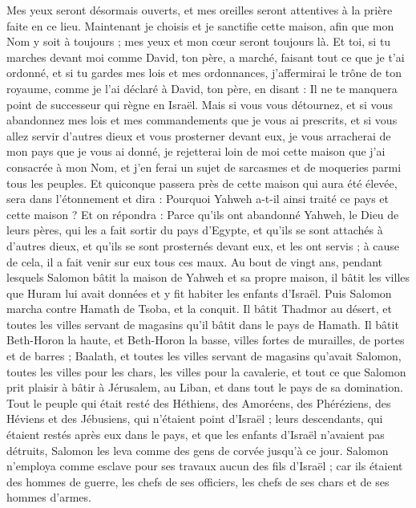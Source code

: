 \begin{multicols}{2}
Mes yeux seront désormais ouverts, et mes oreilles seront attentives à la prière faite en ce lieu.
Maintenant je choisis et je sanctifie cette maison, afin que mon Nom y soit à toujours ; mes yeux et mon cœur seront toujours là.
Et toi, si tu marches devant moi comme David, ton père, a marché, faisant tout ce que je t'ai ordonné, et si tu gardes mes lois et mes ordonnances,
j'affermirai le trône de ton royaume, comme je l'ai déclaré à David, ton père, en disant : Il ne te manquera point de successeur qui règne en Israël.
Mais si vous vous détournez, et si vous abandonnez mes lois et mes commandements que je vous ai prescrits, et si vous allez servir d'autres dieux et vous prosterner devant eux,
je vous arracherai de mon pays que je vous ai donné, je rejetterai loin de moi cette maison que j'ai consacrée à mon Nom, et j'en ferai un sujet de sarcasmes et de moqueries parmi tous les peuples.
Et quiconque passera près de cette maison qui aura été élevée, sera dans l'étonnement et dira : Pourquoi Yahweh a-t-il ainsi traité ce pays et cette maison ?
Et on répondra : Parce qu'ils ont abandonné Yahweh, le Dieu de leurs pères, qui les a fait sortir du pays d'Egypte, et qu'ils se sont attachés à d'autres dieux, et qu'ils se sont prosternés devant eux, et les ont servis ; à cause de cela, il a fait venir sur eux tous ces maux.
\VerseOne{}Au bout de vingt ans, pendant lesquels Salomon bâtit la maison de Yahweh et sa propre maison,
il bâtit les villes que Huram lui avait données et y fit habiter les enfants d'Israël.
Puis Salomon marcha contre Hamath de Tsoba, et la conquit.
Il bâtit Thadmor au désert, et toutes les villes servant de magasins qu'il bâtit dans le pays de Hamath.
Il bâtit Beth-Horon la haute, et Beth-Horon la basse, villes fortes de murailles, de portes et de barres ;
Baalath, et toutes les villes servant de magasins qu'avait Salomon, toutes les villes pour les chars, les villes pour la cavalerie, et tout ce que Salomon prit plaisir à bâtir à Jérusalem, au Liban, et dans tout le pays de sa domination.
Tout le peuple qui était resté des Héthiens, des Amoréens, des Phéréziens, des Héviens et des Jébusiens, qui n'étaient point d'Israël ;
leurs descendants, qui étaient restés après eux dans le pays, et que les enfants d'Israël n'avaient pas détruits, Salomon les leva comme des gens de corvée jusqu'à ce jour.
Salomon n'employa comme esclave pour ses travaux aucun des fils d'Israël ; car ils étaient des hommes de guerre, les chefs de ses officiers, les chefs de ses chars et de ses hommes d'armes.

\end{multicols}
